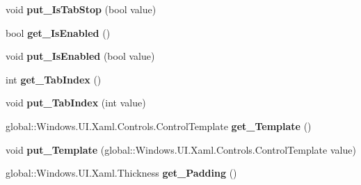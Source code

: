 \begin{DoxyCompactItemize}
\mbox{\label{interface_windows_1_1_u_i_1_1_xaml_1_1_controls_1_1_i_control_aa68f56eae9d742596d921ebd0fa1d01a}} 
void {\bfseries put\+\_\+\+Is\+Tab\+Stop} (bool value)
\item 
\mbox{\label{interface_windows_1_1_u_i_1_1_xaml_1_1_controls_1_1_i_control_af6badb421eed5eedf78de5f6a798069f}} 
bool {\bfseries get\+\_\+\+Is\+Enabled} ()
\item 
\mbox{\label{interface_windows_1_1_u_i_1_1_xaml_1_1_controls_1_1_i_control_a77bf29586295b2ff15c2306dc6daf932}} 
void {\bfseries put\+\_\+\+Is\+Enabled} (bool value)
\item 
\mbox{\label{interface_windows_1_1_u_i_1_1_xaml_1_1_controls_1_1_i_control_a0849d00c16f282e234c52079d37fbd5a}} 
int {\bfseries get\+\_\+\+Tab\+Index} ()
\item 
\mbox{\label{interface_windows_1_1_u_i_1_1_xaml_1_1_controls_1_1_i_control_a18bbebda6a6cee0159bb14a9ac6ee66f}} 
void {\bfseries put\+\_\+\+Tab\+Index} (int value)
\item 
\mbox{\label{interface_windows_1_1_u_i_1_1_xaml_1_1_controls_1_1_i_control_a81ca470482b238153cd3f15d30056ed8}} 
global\+::\+Windows.\+U\+I.\+Xaml.\+Controls.\+Control\+Template {\bfseries get\+\_\+\+Template} ()
\item 
\mbox{\label{interface_windows_1_1_u_i_1_1_xaml_1_1_controls_1_1_i_control_a47a20a386ef872f62d75cd4371bdc883}} 
void {\bfseries put\+\_\+\+Template} (global\+::\+Windows.\+U\+I.\+Xaml.\+Controls.\+Control\+Template value)
\item 
\mbox{\label{interface_windows_1_1_u_i_1_1_xaml_1_1_controls_1_1_i_control_a452993e07931c19d328c465e2fbf9c1b}} 
global\+::\+Windows.\+U\+I.\+Xaml.\+Thickness {\bfseries get\+\_\+\+Padding} ()

\end{DoxyCompactItemize}
